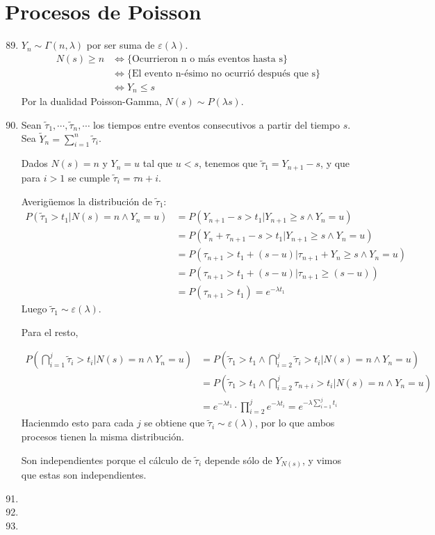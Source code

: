 \section{Procesos de Poisson}
\begin{enumerate}
	\setcounter{enumi}{88}
	\item
		$Y_n \sim \Gamma(n, \lambda)$ por ser suma de $\varepsilon(\lambda)$.
		\begin{align*}
			N(s) \geq n	& \Longleftrightarrow \{\text{Ocurrieron n o más eventos hasta s}\}			\\
						& \Longleftrightarrow \{\text{El evento n-ésimo no ocurrió después que s}\}	\\
						& \Longleftrightarrow Y_n \leq s
		\end{align*}
		Por la dualidad Poisson-Gamma, $N(s)\sim P(\lambda s)$.
	
	\item
		Sean $\tilde\tau_1, \cdots, \tilde\tau_n, \cdots$ los tiempos entre eventos consecutivos a partir del tiempo $s$. Sea $\tilde Y_n = \sum_{i=1}^n \tilde\tau_i$.
		
		Dados $N(s) = n$ y $Y_n = u$ tal que $u<s$, tenemos que $\tilde\tau_1 = Y_{n+1}-s$, y que para $i>1$ se cumple $\tilde\tau_i = \tau{n+i}$.
		
		Averigüemos la distribución de $\tilde\tau_1$:
		\begin{align*}
			P(\tilde\tau_1 > t_1 | N(s)=n \land Y_n = u)	& = P(Y_{n+1} - s > t_1 | Y_{n+1} \geq s \land Y_n = u)						\\
															& = P(Y_n + \tau_{n+1} - s > t_1 | Y_{n+1} \geq s \land Y_n = u)			\\
															& = P(\tau_{n+1} > t_1 + (s - u) | \tau_{n+1} + Y_n \geq s \land Y_n = u)	\\
															& = P(\tau_{n+1} > t_1 + (s - u) | \tau_{n+1} \geq (s - u))					\\
															& = P(\tau_{n+1} > t_1) = e^{-\lambda t_1}
		\end{align*}
		Luego $\tilde\tau_1 \sim \varepsilon(\lambda)$.
		
		Para el resto,
		
		\begin{align*}
			P\left(\bigcap_{i=1}^j \tilde\tau_i > t_i | N(s)=n \land Y_n = u\right)	& = P\left(\tilde\tau_1 > t_1 \land \bigcap_{i=2}^j \tilde\tau_i > t_i | N(s)=n \land Y_n = u\right)	\\
																					& = P\left(\tilde\tau_1 > t_1 \land \bigcap_{i=2}^j \tau_{n+i} > t_i | N(s)=n \land Y_n = u\right)		\\
																					& = e^{-\lambda t_1} \cdot \prod_{i=2}^j e^{-\lambda t_i} = e^{-\lambda \sum_{i=1}^j t_i}
		\end{align*}
		 Hacienmdo esto para cada $j$ se obtiene que $\tilde\tau_i \sim \varepsilon(\lambda)$, por lo que ambos procesos tienen la misma distribución.
		 
		 Son independientes porque el cálculo de $\tilde\tau_i$ depende sólo de $Y_{N(s)}$, y vimos que estas son independientes.
	\item
		
	\item
	\item
\end{enumerate}
